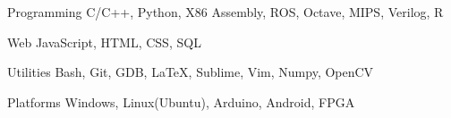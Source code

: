 \documentclass[12pt, a4paper]{awesome-cv}
\begin{document}

\begin{cvskills}


  \cvskill
  {Programming}
  {C/C++, Python, X86 Assembly, ROS, Octave, MIPS, Verilog, R }


  \cvskill
  {Web}
  {JavaScript, HTML, CSS, SQL}


  \cvskill
  {Utilities}
  {Bash, Git, GDB, \LaTeX, Sublime, Vim, Numpy, OpenCV}
  
  \cvskill
  {Platforms}
  {Windows, Linux(Ubuntu), Arduino, Android, FPGA}
\end{cvskills}
\end{document}
